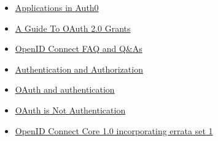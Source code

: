 \documentclass[12pt]{article}
\begin{document}
\begin{itemize}
\tightlist
\item
  \href{https://auth0.com/docs/applications}{Applications in Auth0}
\item
  \href{https://alexbilbie.com/guide-to-oauth-2-grants/}{A Guide To OAuth 2.0 Grants}
\item
  \href{https://openid.net/connect/faq/}{OpenID Connect FAQ and Q\&As}
\item
  \href{https://auth0.com/docs/authorization/authentication-and-authorization}{Authentication and Authorization}
\item
  \href{https://stackoverflow.com/questions/48544500/oauth-and-authentication}{OAuth and authentication}
\item
  \href{https://www.scottbrady91.com/OAuth/OAuth-is-Not-Authentication}{OAuth is Not Authentication}
\item
  \href{https://openid.net/specs/openid-connect-core-1_0.html}{OpenID Connect Core 1.0 incorporating errata set 1}
\end{itemize}
\end{document}
